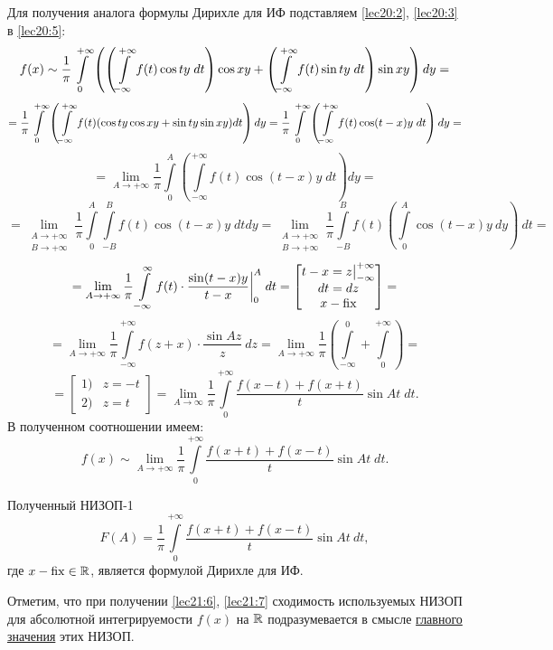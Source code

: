 \documentclass[../../main.tex]{subfiles}
\begin{document}
Для получения аналога формулы Дирихле для ИФ подставляем
\eqref{lec20:2}, \eqref{lec20:3} в \eqref{lec20:5}:
\[
f(x) \sim \dfrac{1}{\pi} \int\limits_{0}^{+\infty}
\left(
\left(\int\limits_{-\infty}^{+\infty} f(t) \cos ty\;dt\right) \cos xy +
\left(
\int\limits_{-\infty}^{+\infty} f(t) \sin ty\;dt
\right) \sin xy 
\right) dy = \] \[ =
\dfrac{1}{\pi}
\int\limits_{0}^{+\infty} \left(
\int\limits_{-\infty}^{+\infty} f(t) (\cos ty\cos xy + \sin ty\sin xy) dt
\right) dy =
\dfrac{1}{\pi} \int\limits_{0}^{+\infty} \left(
\int\limits_{-\infty}^{+\infty} f(t) \cos(t - x)y\;dt
\right) dy = \] \[ =
\lim\limits_{A \to +\infty} \dfrac{1}{\pi}
\int\limits_0^{A} \left(
\int\limits_{-\infty}^{+\infty}
f(t) \cos(t - x)y\;dt
\right) dy =
\] \[ = 
\lim\limits_{\substack{A \to +\infty \\ B \to +\infty}} \dfrac{1}{\pi}
\int\limits_0^A \int\limits_{-B}^B f(t) \cos(t-x)y\;dtdy =
\lim\limits_{\substack{A \to +\infty \\ B \to +\infty}}
\dfrac{1}{\pi} \int\limits_{-B}^B f(t) \left(
\int\limits_0^A
 \cos (t - x) y\ dy \right)\ dt =
\] \[ = 
\lim\limits_{A \to +\infty} \dfrac{1}{\pi}
\int\limits_{-\infty}^{\infty} f(t) \cdot
\dfrac{\sin (t - x)y}{t - x}\bigg|_0^A\;dt = 
\begin{bmatrix}
t - x = z \big|_{-\infty}^{+\infty}\\
dt = dz \\
x - \operatorname{fix}
\end{bmatrix} =
\] \[ = 
\lim\limits_{A \to +\infty} \dfrac{1}{\pi} 
\int\limits_{-\infty}^{+\infty} f(z + x)\cdot
\dfrac{\sin Az}{z}\ dz =
\lim\limits_{A \to +\infty} \dfrac{1}{\pi}
\left(
\int\limits_{-\infty}^{0} + 
\int\limits_{0}^{+\infty}
\right) =
\] \[ = 
\begin{bmatrix}
1)& z = -t \\
2)& z = t
\end{bmatrix} =
\lim\limits_{A \to \infty} \dfrac{1}{\pi}
\int\limits_{0}^{+\infty}
\dfrac{f(x - t) + f(x + t)}{t} \sin At\;dt.
\]
В полученном соотношении имеем:
\begin{equation}
\label{lec21:6}
	f(x) \sim \lim\limits_{A \to +\infty} \dfrac{1}{\pi} 
	\int\limits_0^{+\infty} \dfrac{f(x + t) + f(x - t)}{t} \sin At\;dt.
\end{equation}

Полученный НИЗОП-1
\begin{equation}
\label{lec21:7}
	F(A) = \dfrac{1}{\pi} \int\limits_0^{+\infty} 
	\dfrac{f(x + t) + f(x - t)}{t} \sin At\ dt,
\end{equation}
где $ x - \operatorname{fix} \in \mathbb{R} $, является формулой Дирихле для ИФ.

Отметим, что при получении \eqref{lec21:6}, \eqref{lec21:7}
сходимость используемых НИЗОП для абсолютной интегрируемости $f(x)$ на
$\mathbb{R}$ подразумевается в смысле \underline{главного значения} этих НИЗОП.
\end{document}
